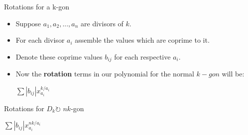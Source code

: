 \documentclass{beamer}
\begin{document}



\begin{frame}{Rotations for a k-gon}
	\begin{itemize}
		\item	Suppose $a_1,a_2,...,a_n$ are divisors of $k$.\\
 		\item For each divisor $a_i$ assemble the values which are coprime to it. \\
		\item Denote these coprime values $b_{ij}$ for each respective $a_i$.\\
		\item Now the \textbf{rotation} terms in our polynomial for the normal $k-gon$ will be:\\
		\begin{center}
        $\sum |b_{ij}|x^{k/a_i}_{a_i}$
        \end{center}
	\end{itemize}
\end{frame}
\begin{frame}{Rotations for $D_k \circlearrowright$ $nk$-gon}

\begin{center}
        $\sum |b_{ij}|x^{nk/a_i}_{a_i}$
        \end{center}
\end{frame}
\end{document}
